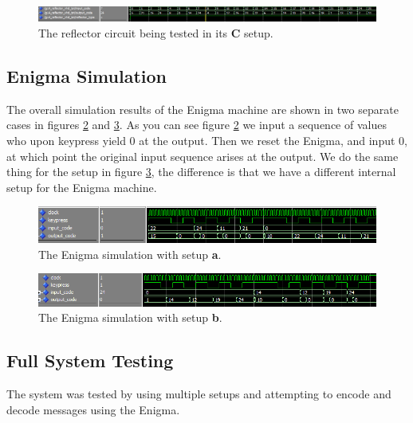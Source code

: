 \documentclass{article}
\begin{document}
\begin{figure}[ht!]
    \centering
    \includegraphics[scale=0.35]{reflectorC.PNG}
    \caption{The reflector circuit being tested in its \textbf{C} setup.}
    \label{fig:reflectorC}
\end{figure}

\subsection{Enigma Simulation}
The overall simulation results of the Enigma machine are shown in two separate cases in figures \ref{fig:enig_sim1} and \ref{fig:enig_sim2}. As you can see figure \ref{fig:enig_sim1} we input a sequence of values who upon keypress yield 0 at the output. Then we reset the Enigma, and input 0, at which point the original input sequence arises at the output. We do the same thing for the setup in figure \ref{fig:enig_sim2}, the difference is that we have a different internal setup for the Enigma machine. 

\begin{figure}[ht!]
    \centering
    \includegraphics[scale=0.35]{enigma_sim_1.PNG}
    \caption{The Enigma simulation with setup \textbf{a}.}
    \label{fig:enig_sim1}
\end{figure}


\begin{figure}[ht!]
    \centering
    \includegraphics[scale=0.35]{enigma_sim_2.PNG}
    \caption{The Enigma simulation with setup \textbf{b}.}
    \label{fig:enig_sim2}
\end{figure}


\subsection{Full System Testing}
The system was tested by using multiple setups and attempting to encode and decode messages using the Enigma. 
\end{document}
